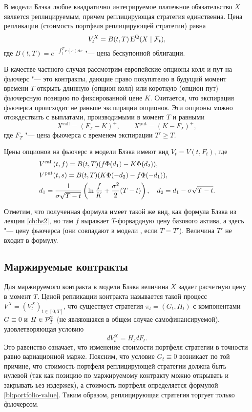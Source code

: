\begin{proposition}
В модели Блэка любое квадратично интегрируемое платежное обязательство $X$ является реплицируемым, причем реплицирующая стратегия единственна.
Цена репликации (стоимость портфеля реплицирующей стратегии) равна
\[
V_t^X = B(t,T)\operatorname{E}^{\mathrm{Q}} (X \mid \mathcal{F}_t),
\]
где $B(t,T) = e^{-\int_t^T r(s)ds}$ "--- цена бескупонной облигации.
\end{proposition}

В качестве частного случая рассмотрим европейские опционы колл и пут на фьючерс "--- это контракты, дающие право покупателю в будущий момент времени $T$ открыть длинную (опцион колл) или короткую (опцион пут) фьючерсную позицию по фиксированной цене $K$.
Считается, что экспирация фьючерса происходит не раньше экспирации опционов.
Эти опционы можно отождествить с выплатами, производимыми в момент $T$ и равными
\[
X^\text{call} = (F_T-K)^+, \qquad X^\text{put} = (K-F_T)^+,
\]
где $F_T$ "--- цена фьючерса с временем экспирации $T'\ge T$. 

\begin{corollary}
\label{bl:c:black-formula}
Цены опционов на фьючерс в модели Блэка имеют вид $V_t=V(t,F_t)$, где
\[
\begin{aligned}
&V^{\text{\normalfont call}}(t,f) = B(t,T) (f\Phi(d_1) - K\Phi(d_2)), \\
&V^{\text{\normalfont put}}(t,s) = B(t,T) (K\Phi(-d_2) - f\Phi(-d_1)),\\
&d_1 = \frac{1}{\sigma\sqrt{T-t}} \left(\ln\frac{f}{K} + \frac{\sigma^2}{2}(T-t)\right), \quad
d_2 = d_1 - \sigma\sqrt{T-t}.
\end{aligned}
\]
\end{corollary}

Отметим, что полученная формула имеет такой же вид, как формула Блэка из лекции \ref{ch:bs2}, но там $f$ выражает $T$-форвардную цену базового актива, а здесь "--- цену фьючерса (они совпадают в модели \bs, если $T=T'$).
Величина $T'$ не входит в формулу.


\subsection{Маржируемые контракты}

Для маржируемого контракта в модели Блэка величина $X$ задает расчетную цену в момент $T$.
Ценой репликации контракта называется такой процесс $V^X = (V_t^X)_{t\in[0,T]}$, что существует стратегия $\pi_t=(G_t,H_t)$ с компонентами $G\equiv 0$ и $H\in \mathcal{P}_T^2$ (не являющаяся в общем случае самофинансируемой), удовлетворяющая условию
\[
d V_t^X = H_t d F_t.
\]
Это равенство означает, что изменение стоимости портфеля стратегии в точности равно вариационной марже.
Поясним, что условие $G_t\equiv 0$ возникает по той причине, что стоимость портфеля реплицирующей стратегии должна быть нулевой (так как позицию по маржируемому контракту можно открывать и закрывать ьез издержек), а стоимость портфеля определяется формулой \eqref{bl:portfolio-value}.
Таким образом, реплицирующая стратегия торгует только фьючерсом.


